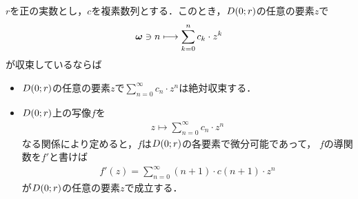 	\begin{screen}
		\begin{thm}[級数で表される関数は微分可能]
			$r$を正の実数とし，$c$を複素数列とする．このとき，$D(0;r)$の任意の要素$z$で
			\begin{align}
				{\boldsymbol \omega} \ni n \longmapsto \sum_{k=0}^{n} c_{k} \cdot z^{k}
			\end{align}
			が収束しているならば
			\begin{itemize}
				\item $D(0;r)$の任意の要素$z$で$\sum_{n=0}^{\infty} c_{n} \cdot z^{n}$は絶対収束する．
				\item $D(0;r)$上の写像$f$を
					\begin{align}
						z \longmapsto \sum_{n=0}^{\infty} c_{n} \cdot z^{n}
					\end{align}
					なる関係により定めると，$f$は$D(0;r)$の各要素で微分可能であって，
					$f$の導関数を$f'$と書けば
					\begin{align}
						f'(z) = \sum_{n=0}^{\infty} (n+1) \cdot c(n+1) \cdot z^{n}
					\end{align}
					が$D(0;r)$の任意の要素$z$で成立する．
			\end{itemize}
		\end{thm}
	\end{screen}